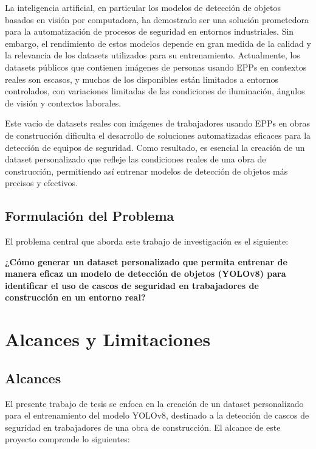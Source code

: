 La inteligencia artificial, en particular los modelos de detección de objetos basados en visión por computadora, ha demostrado ser una solución prometedora para la automatización de procesos de seguridad en entornos industriales. Sin embargo, el rendimiento de estos modelos depende en gran medida de la calidad y la relevancia de los datasets utilizados para su entrenamiento. Actualmente, los datasets públicos que contienen imágenes de personas usando EPPs en contextos reales son escasos, y muchos de los disponibles están limitados a entornos controlados, con variaciones limitadas de las condiciones de iluminación, ángulos de visión y contextos laborales.

Este vacío de datasets reales con imágenes de trabajadores usando EPPs en obras de construcción dificulta el desarrollo de soluciones automatizadas eficaces para la detección de equipos de seguridad. Como resultado, es esencial la creación de un dataset personalizado que refleje las condiciones reales de una obra de construcción, permitiendo así entrenar modelos de detección de objetos más precisos y efectivos.

\subsection{Formulación del Problema}

El problema central que aborda este trabajo de investigación es el siguiente:

\textbf{¿Cómo generar un dataset personalizado que permita entrenar de manera eficaz un modelo de detección de objetos (YOLOv8) para identificar el uso de cascos de seguridad en trabajadores de construcción en un entorno real?}

\section{Alcances y Limitaciones}

\subsection{Alcances}

El presente trabajo de tesis se enfoca en la creación de un dataset personalizado para el entrenamiento del modelo YOLOv8, destinado a la detección de cascos de seguridad en trabajadores de una obra de construcción. El alcance de este proyecto comprende lo siguientes:

